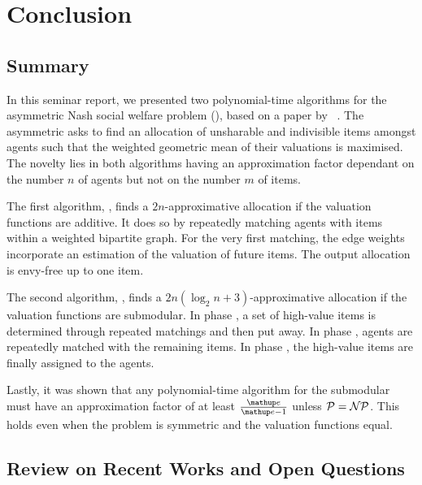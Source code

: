\section{Conclusion}
\label{sec:conclusion}

\subsection{Summary}
\label{subsec:conclusion:summary}

In this seminar report, we presented two polynomial-time algorithms for the asymmetric Nash social welfare problem (\NSW), based on a paper by \citeauthor{APNSWuSVþUM}~\cite{APNSWuSVþUM}.
The asymmetric \NSW{} asks to find an allocation of unsharable and indivisible items amongst agents such that the weighted geometric mean of their valuations is maximised.
The novelty lies in both algorithms having an approximation factor dependant on the number \(n\) of agents but not on the number \(m\) of items.

The first algorithm, \SMatch, finds a \(2n\)-approximative allocation if the valuation functions are additive.
It does so by repeatedly matching agents with items within a weighted bipartite graph.
For the very first matching, the edge weights incorporate an estimation of the valuation of future items.
The output allocation is envy-free up to one item.

The second algorithm, \RepReMatch, finds a \(2n(\log_2 n + 3)\)-approximative allocation if the valuation functions are submodular.
In phase \phasei, a set of high-value items is determined through repeated matchings and then put away.
In phase \phaseii, agents are repeatedly matched with the remaining items.
In phase \phaseiii, the high-value items are finally assigned to the agents.

Lastly, it was shown that any polynomial-time algorithm for the submodular \NSW{} must have an approximation factor of at least \(\frac{\euler}{\euler - 1}\) unless \(\mathcal{P} = \mathcal{N\kern-0.05em P}\).
This holds even when the problem is symmetric and the valuation functions equal.

\subsection{Review on Recent Works and Open Questions}
\label{subsec:conclusion:outlook}

